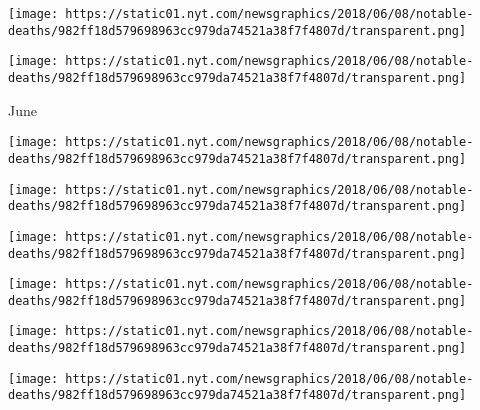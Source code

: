 \href{https://www.nytimes.com/2018/07/03/obituaries/alfred-alberts-unsung-father-of-a-cholesterol-drug-dies-at-87.html}{}

\texttt{[image: https://static01.nyt.com/newsgraphics/2018/06/08/notable-deaths/982ff18d579698963cc979da74521a38f7f4807d/transparent.png]}

\href{https://www.nytimes.com/2018/07/02/obituaries/gillian-lynne-choreographer-of-cats-is-dead-at-92.html}{}

\texttt{[image: https://static01.nyt.com/newsgraphics/2018/06/08/notable-deaths/982ff18d579698963cc979da74521a38f7f4807d/transparent.png]}

June

\href{https://www.nytimes.com/2018/07/30/obituaries/herman-shine-one-of-the-few-to-escape-auschwitz-dies-at-95.html}{}

\texttt{[image: https://static01.nyt.com/newsgraphics/2018/06/08/notable-deaths/982ff18d579698963cc979da74521a38f7f4807d/transparent.png]}

\href{https://www.nytimes.com/2018/07/01/obituaries/liliane-montevecchi-dead.html}{}

\texttt{[image: https://static01.nyt.com/newsgraphics/2018/06/08/notable-deaths/982ff18d579698963cc979da74521a38f7f4807d/transparent.png]}

\href{https://www.nytimes.com/2018/07/01/obituaries/arvid-carlsson-who-discovered-a-treatment-for-parkinsons-dies-at-95.html}{}

\texttt{[image: https://static01.nyt.com/newsgraphics/2018/06/08/notable-deaths/982ff18d579698963cc979da74521a38f7f4807d/transparent.png]}

\href{https://www.nytimes.com/2018/07/01/obituaries/donald-ritchie-record-breaking-ultrarunner-is-dead-at-73.html}{}

\texttt{[image: https://static01.nyt.com/newsgraphics/2018/06/08/notable-deaths/982ff18d579698963cc979da74521a38f7f4807d/transparent.png]}

\href{https://www.nytimes.com/2018/06/29/obituaries/harlan-ellison-intensely-prolific-science-fiction-writer-dies-at-84.html}{}

\texttt{[image: https://static01.nyt.com/newsgraphics/2018/06/08/notable-deaths/982ff18d579698963cc979da74521a38f7f4807d/transparent.png]}

\href{https://www.nytimes.com/2018/06/28/obituaries/constance-adams-architect-of-space-habitats-is-dead-at-53.html}{}

\texttt{[image: https://static01.nyt.com/newsgraphics/2018/06/08/notable-deaths/982ff18d579698963cc979da74521a38f7f4807d/transparent.png]}

